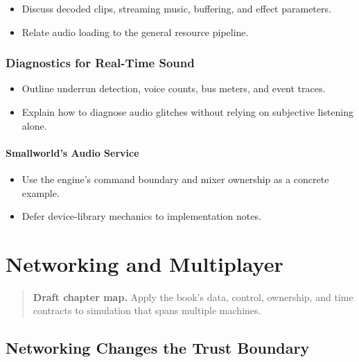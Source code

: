 \documentclass[
  11pt,
  letterpaper,
  DIV=11,
  numbers=noendperiod,
  twoside,
  open=right]{scrreprt}
\providecommand{\tightlist}{%
  \setlength{\itemsep}{0pt}\setlength{\parskip}{0pt}}
\begin{document}
\begin{itemize}
\tightlist
\item
  Discuss decoded clips, streaming music, buffering, and effect
  parameters.
\item
  Relate audio loading to the general resource pipeline.
\end{itemize}

\subsection{Diagnostics for Real-Time
Sound}\label{diagnostics-for-real-time-sound}

\begin{itemize}
\tightlist
\item
  Outline underrun detection, voice counts, bus meters, and event
  traces.
\item
  Explain how to diagnose audio glitches without relying on subjective
  listening alone.
\end{itemize}

\subsubsection{Smallworld's Audio
Service}\label{smallworlds-audio-service}

\begin{itemize}
\tightlist
\item
  Use the engine's command boundary and mixer ownership as a concrete
  example.
\item
  Defer device-library mechanics to implementation notes.
\end{itemize}

\chapter{Networking and Multiplayer}\label{networking-and-multiplayer}

\begin{quote}
\textbf{Draft chapter map.} Apply the book's data, control, ownership,
and time contracts to simulation that spans multiple machines.
\end{quote}

\section{Networking Changes the Trust
Boundary}\label{networking-changes-the-trust-boundary}
\end{document}
